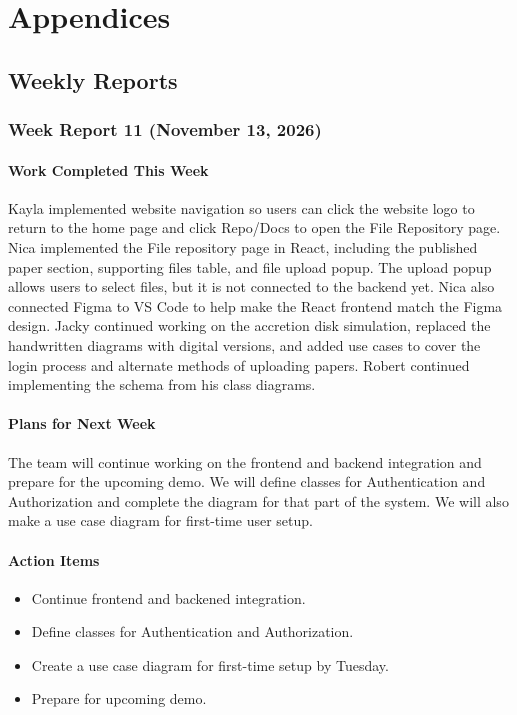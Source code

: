 \part{Appendices}
\chapter{Weekly Reports}
\label{Weekly Reports}
\section{Week Report 11 (November 13, 2026)}
\subsection{Work Completed This Week}
Kayla implemented website navigation so users can click the website logo to return to the home page and click Repo/Docs to open the File Repository page. Nica implemented the File repository page in React, including the published paper section, supporting files table, and file upload popup. The upload popup allows users to select files, but it is not connected to the backend yet. Nica also connected Figma to VS Code to help make the React frontend match the Figma design. Jacky continued working on the accretion disk simulation, replaced the handwritten diagrams with digital versions, and added use cases to cover the login process and alternate methods of uploading papers. Robert continued implementing the schema from his class diagrams.

\subsection{Plans for Next Week}
The team will continue working on the frontend and backend integration and prepare for the upcoming demo. We will define classes for Authentication and Authorization and complete the diagram for that part of the system. We will also make a use case diagram for first-time user setup.

\subsection{Action Items}
\begin{itemize}
    \item Continue frontend and backened integration.
    \item Define classes for Authentication and Authorization.
    \item Create a use case diagram for first-time setup by Tuesday.
    \item Prepare for upcoming demo.
\end{itemize}

